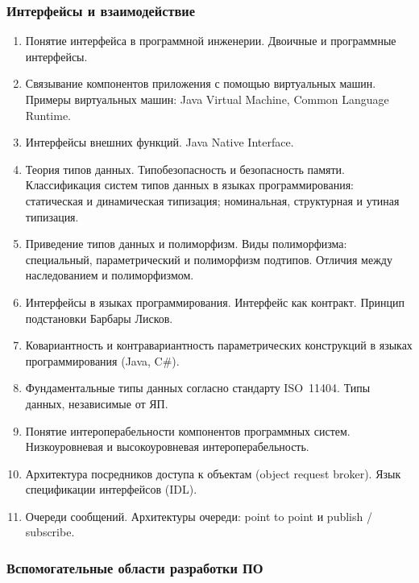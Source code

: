 \documentclass[a4paper,10pt]{article}
\newcounter{globalenum}
\newenvironment{genumerate}{%
	\begin{enumerate}%
	\afterlabel.%
	\setcounter{enumi}{\theglobalenum}%
}{%
	\setcounter{globalenum}{\theenumi}%
	\end{enumerate}%
}
\begin{document}
\subsubsection*{Интерфейсы и взаимодействие}

\begin{genumerate}
	\item
	Понятие интерфейса в программной инженерии. Двоичные и программные интерфейсы.

	\item
	Связывание компонентов приложения с помощью виртуальных машин. 
	Примеры виртуальных машин: Java Virtual Machine, Common Language Runtime.

	\item
	Интерфейсы внешних функций. Java Native Interface.

	\item
	Теория типов данных. Типобезопасность и безопасность памяти. 
	Классификация систем типов данных в языках программирования: 
	статическая и динамическая типизация; номинальная, структурная и утиная типизация.

	\item
	Приведение типов данных и полиморфизм. 
	Виды полиморфизма: специальный, параметрический и полиморфизм подтипов. 
	Отличия между наследованием и полиморфизмом.

	\item
	Интерфейсы в языках программирования. Интерфейс как контракт. 
	Принцип подстановки Барбары Лисков.

	\item
	Ковариантность и контравариантность параметрических конструкций в языках программирования (Java, C\#).

	\item
	Фундаментальные типы данных согласно стандарту ISO~11404. 
	Типы данных, независимые от ЯП.

	\item
	Понятие интероперабельности компонентов программных систем. 
	Низкоуровневая и высокоуровневая интероперабельность.

	\item
	Архитектура посредников доступа к объектам (object request broker). 
	Язык спецификации интерфейсов (IDL).

	\item
	Очереди сообщений. Архитектуры очереди: point to point и publish / subscribe.
\end{genumerate}

\subsubsection*{Вспомогательные области разработки ПО}
\end{document}

